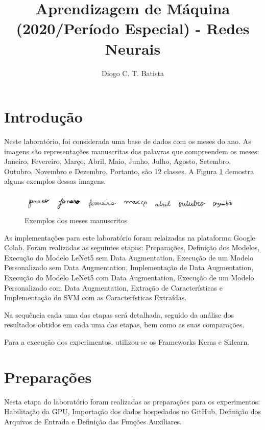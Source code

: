 \documentclass[12pt]{article}
\title{Aprendizagem de Máquina (2020/Período Especial) - Redes Neurais}
\author{Diogo C. T. Batista\inst{1}}
\begin{document}
\maketitle

\section{Introdução}

Neste laboratório, foi considerada uma base de dados com os meses do ano. As imagens são representações manuscritas das palavras que compreendem os meses: Janeiro, Fevereiro, Março, Abril, Maio, Junho, Julho, Agosto, Setembro, Outubro, Novembro e Dezembro. Portanto, são 12 classes. A Figura \ref{fig:image_months} demostra alguns exemplos dessas imagens.

\begin{figure}[!htb]
  \centering
  \includegraphics[width=35em]{images/image_months.png}
  \caption{Exemplos dos meses manuscritos}
  \label{fig:image_months}
\end{figure}

As implementações para este laboratório foram relaizadas na plataforma Google Colab. Foram realizadas as seguintes etapas: Preparações, Definição dos Modelos, Execução do Modelo LeNet5 sem Data Augmentation, Execução de um Modelo Personalizado sem Data Augmentation, Implementação de Data Augmentation, Execução do Modelo LeNet5 com Data Augmentation, Execução de um Modelo Personalizado com Data Augmentation, Extração de Características e Implementação do SVM com as Características Extraídas.

Na sequência cada uma das etapas será detalhada, seguido da análise dos resultados obtidos em cada uma das etapas, bem como as suas comparações.

Para a execução dos experimentos, utilizou-se os Frameworks Keras e Sklearn.

\section{Preparações}

Nesta etapa do laboratório foram realizadas as preparações para os experimentos: Habilitação da GPU, Importação dos dados hospedados no GitHub, Definição dos Arquivos de Entrada e Definição das Funções Auxiliares.
\end{document}
